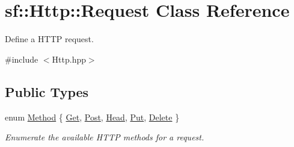 \hypertarget{classsf_1_1_http_1_1_request}{}\section{sf\+:\+:Http\+:\+:Request Class Reference}
\label{classsf_1_1_http_1_1_request}


Define a H\+T\+TP request.  




{\ttfamily \#include $<$Http.\+hpp$>$}

\subsection*{Public Types}
\begin{DoxyCompactItemize}
\item 
enum \mbox{\hyperlink{classsf_1_1_http_1_1_request_a620f8bff6f43e1378f321bf53fbf5598}{Method}} \{ \newline
\mbox{\hyperlink{classsf_1_1_http_1_1_request_a620f8bff6f43e1378f321bf53fbf5598ab822baed393f3d0353621e5378b9fcb4}{Get}}, 
\mbox{\hyperlink{classsf_1_1_http_1_1_request_a620f8bff6f43e1378f321bf53fbf5598ae8ec4048b9550f8d0747d4199603141a}{Post}}, 
\mbox{\hyperlink{classsf_1_1_http_1_1_request_a620f8bff6f43e1378f321bf53fbf5598a4df23138be7ed60f47aba6548ba65e7b}{Head}}, 
\mbox{\hyperlink{classsf_1_1_http_1_1_request_a620f8bff6f43e1378f321bf53fbf5598a523b94f9af069c1f35061d32011e2495}{Put}}, 
\newline
\mbox{\hyperlink{classsf_1_1_http_1_1_request_a620f8bff6f43e1378f321bf53fbf5598abc9555b94c1b896185015ec3990999f9}{Delete}}
 \}
\begin{DoxyCompactList}\small\item\em Enumerate the available H\+T\+TP methods for a request. \end{DoxyCompactList}\end{DoxyCompactItemize}

